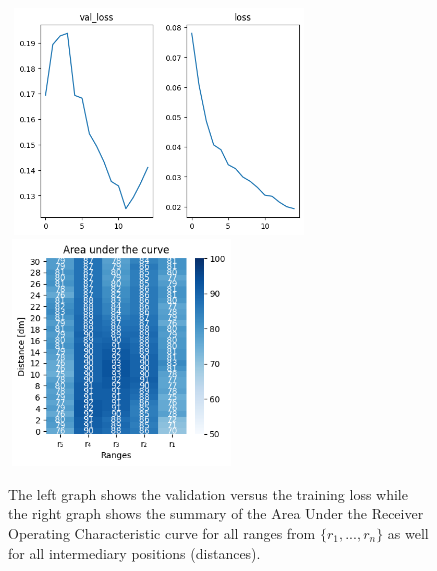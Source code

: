 \begin{multicols}{2}
\begin{itemize}
\end{itemize}
\end{multicols}\begin{figure}[H]%
\centering
\includegraphics[width=8cm,height=6cm]{3_models/models_26/graph_26.png}
\hspace{0.2 cm}
\includegraphics[width=6cm,height=6cm]{4_plots/plots_26/AUC_26.png}
\caption{The left graph shows the validation versus the training loss while the right graph shows the summary of the Area Under the Receiver Operating Characteristic curve for all ranges from $\{r_{1}, ... ,r_{n}\}$ as well for all intermediary positions (distances).}
\label{auc_26}
\end{figure}


\newpage
